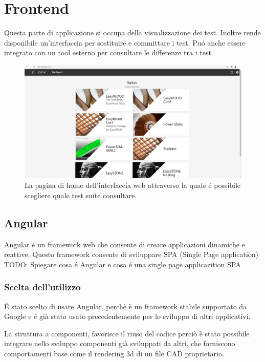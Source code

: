 \chapter{Frontend}
    Questa parte di applicazione si occupa della visualizzazione dei test.
    Inoltre rende disponibile un'interfaccia per sostituire e committare i test.
    Pu\'o anche essere integrato con un tool esterno per consultare le differenze tra i test.
    \begin{figure}
        \includegraphics[width=\textwidth]{images/homepage.png}
        \caption{La pagina di home dell'interfaccia web attraverso la quale \'e possibile scegliere quale test suite consultare.}
    \end{figure}
    \section{Angular}
        Angular \'e un framework web che consente di creare applicazioni dinamiche e reattive.    
        Questo framework consente di sviluppare SPA (Single Page application)
        TODO: Spiegare cosa \'e Angular e cosa \'e una single page applicazition SPA
        \subsection{Scelta dell'utilizzo}
            \'E stato scelto di usare Angular, perchè è un framework stabile supportato da Google
            e \'e già stato usato precedentemente per lo sviluppo di altri applicativi.
            
            La struttura a componenti, favorisce il riuso del codice perciò è stato possibile integrare
            nello sviluppo componenti già sviluppati da altri, che forniscono comportamenti base
            come il rendering 3d di un file CAD proprietario.
        
